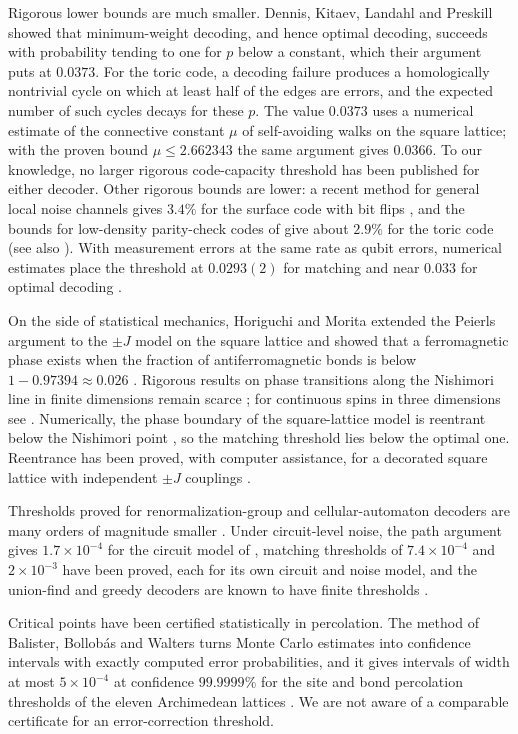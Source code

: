 \documentclass[11pt]{amsart}
\theoremstyle{definition}
\theoremstyle{remark}
\numberwithin{equation}{section}
\begin{document}
Rigorous lower bounds are much smaller. Dennis, Kitaev, Landahl and Preskill \cite{DKLP02} showed that minimum-weight decoding, and hence optimal decoding, succeeds with probability tending to one for $p$ below a constant, which their argument puts at $0.0373$. For the toric code, a decoding failure produces a homologically nontrivial cycle on which at least half of the edges are errors, and the expected number of such cycles decays for these $p$. The value $0.0373$ uses a numerical estimate of the connective constant $\mu$ of self-avoiding walks on the square lattice; with the proven bound $\mu\le2.662343$ \cite{Cou22} the same argument gives $0.0366$.
To our knowledge, no larger rigorous code-capacity threshold has been published for either decoder. Other rigorous bounds are lower: a recent method for general local noise channels gives $3.4\%$ for the surface code with bit flips \cite{KM26}, and the bounds for low-density parity-check codes of \cite{DKP15} give about $2.9\%$ for the toric code (see also \cite{KP13}). With measurement errors at the same rate as qubit errors, numerical estimates place the threshold at $0.0293(2)$ for matching \cite{WHP03} and near $0.033$ for optimal decoding \cite{OAIM04}.

On the side of statistical mechanics, Horiguchi and Morita extended the Peierls argument to the $\pm J$ model on the square lattice and showed that a ferromagnetic phase exists when the fraction of antiferromagnetic bonds is below $1-0.97394\approx0.026$ \cite{HM82}. Rigorous results on phase transitions along the Nishimori line in finite dimensions remain scarce \cite{OO26}; for continuous spins in three dimensions see \cite{GS22}. Numerically, the phase boundary of the square-lattice model is reentrant below the Nishimori point \cite{AH04,PPV09}, so the matching threshold lies below the optimal one. Reentrance has been proved, with computer assistance, for a decorated square lattice with independent $\pm J$ couplings \cite{Pei26}.

Thresholds proved for renormalization-group and cellular-automaton decoders are many orders of magnitude smaller \cite{BH11,KuP19}. Under circuit-level noise, the path argument gives $1.7\times10^{-4}$ for the circuit model of \cite{DKLP02}, matching thresholds of $7.4\times10^{-4}$ \cite{Fow12} and $2\times10^{-3}$ \cite{Tom26} have been proved, each for its own circuit and noise model, and the union-find and greedy decoders are known to have finite thresholds \cite{YLY26}.

Critical points have been certified statistically in percolation. The method of Balister, Bollob\'as and Walters \cite{BBW05} turns Monte Carlo estimates into confidence intervals with exactly computed error probabilities, and it gives intervals of width at most $5\times10^{-4}$ at confidence $99.9999\%$ for the site and bond percolation thresholds of the eleven Archimedean lattices \cite{RW07}. We are not aware of a comparable certificate for an error-correction threshold.
\end{document}
